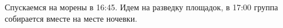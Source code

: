     Спускаемся на морены в 16:45. Идем на разведку площадок, в 17:00 группа собирается вместе на месте ночевки.

    \FloatBarrier
    










